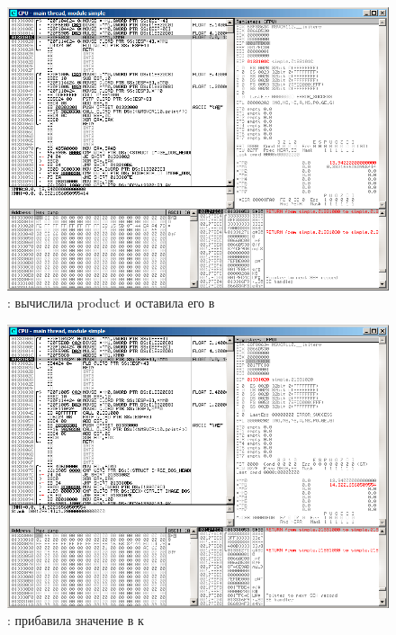 \clearpage
\begin{figure}[H]
\centering
\includegraphics[scale=\FigScale]{patterns/205_floating_SIMD/simple_olly3.png}
\caption{\olly:  вычислила \gls{product} и оставила его в }
\label{fig:FPU_SIMD_simple_olly3}
\end{figure}

\clearpage
\begin{figure}[H]
\centering
\includegraphics[scale=\FigScale]{patterns/205_floating_SIMD/simple_olly4.png}
\caption{\olly:  прибавила значение в  к }
\label{fig:FPU_SIMD_simple_olly4}
\end{figure}

